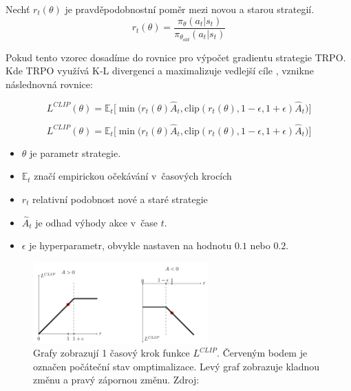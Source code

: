 Nechť $r_t(\theta)$ je pravděpodobnostní poměr mezi novou a starou strategií.
\begin{equation}
  r_t(\theta) = \frac{\pi_\theta(a_t \vert s_t)}{\pi_{\theta_{old}}(a_t \vert s_t)}
\end{equation}

Pokud tento vzorec dosadíme do rovnice pro výpočet gradientu strategie TRPO. Kde TRPO využívá K-L divergenci a maximalizuje vedlejší cíle \cite{policy_gradients}, vznikne následnovná rovnice:

\begin{equation}
  L^{CLIP}(\theta) = \mathbb{E}_t \Big[ \min \Big( r_t(\theta) \hat{A}_t, \text{clip}(r_t(\theta), 1-\epsilon, 1+\epsilon) \hat{A}_t \Big) \Big]
\end{equation}

\begin{equation}
  L^{CLIP}(\theta) = \mathbb{E}_t \Big[ \min \Big( r_t(\theta) \hat{A}_t, \text{clip}(r_t(\theta), 1-\epsilon, 1+\epsilon) \hat{A}_t \Big) \Big]
\end{equation}

\begin{itemize}
  \item $\theta$ je parametr strategie.
  \item $\mathbb{E}_t$ značí empirickou očekávání v~časových krocích
  \item $r_t$ relativní podobnost nové a staré strategie \cite{PPO_paper}
  \item $\hat{A}_t$ je odhad výhody akce v~čase $t$.
  \item $\epsilon$ je hyperparametr, obvykle nastaven na hodnotu $0.1$ nebo $0.2$.
\end{itemize}

\begin{figure}[H]
	\centering
	\includegraphics[width=0.6\textwidth]{obrazky-figures/clip}
	\caption{Grafy zobrazují 1 časový krok funkce $L^{CLIP}$. Červeným bodem je označen počáteční stav omptimalizace. Levý graf zobrazuje kladnou změnu a pravý zápornou změnu.
  Zdroj: \cite{RL_basics}}\label{fig:clip}
\end{figure}

